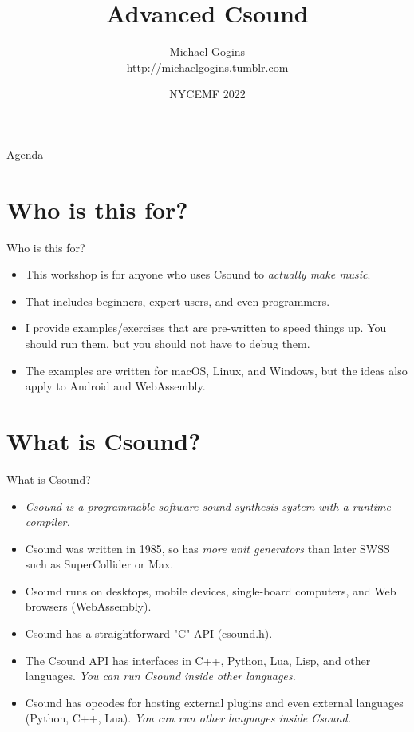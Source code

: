 \documentclass{beamer}
\title{Advanced Csound}
\author[Gogins]
{Michael Gogins \\ \url{http://michaelgogins.tumblr.com}}
\institute[Irreducible Productions]{Irreducible Productions \\ New York}
\date[NYCEMF 2022]{NYCEMF 2022}
\begin{document}

\maketitle

\begin{frame}{Agenda}
\tableofcontents
\end{frame}

\section{Who is this for?}
\begin{frame}{Who is this for?}
\begin{itemize}
\item This workshop is for anyone who uses Csound to \emph{actually make music}.
\item That includes beginners, expert users, and even programmers.
\item I provide examples/exercises that are pre-written to speed things up. You should run them, but you should not have to debug them.
\item The examples are written for macOS, Linux, and Windows, but the ideas also apply to Android and WebAssembly.
\end{itemize}
\end{frame}

\section{What is Csound?}
\begin{frame}{What is Csound?}
\begin{itemize}
\item \emph{Csound is a programmable software sound synthesis system with a runtime compiler.}
\item Csound was written in 1985, so has \emph{more unit generators} than later SWSS such as SuperCollider or Max.
\item Csound runs on desktops, mobile devices, single-board computers, and Web browsers (WebAssembly).
\item Csound has a straightforward "C" API (csound.h).
\item The Csound API has interfaces in C++, Python, Lua, Lisp, and other languages. \emph{You can run Csound inside other languages.}
\item Csound has opcodes for hosting external plugins and even external languages (Python, C++, Lua). \emph{You can run other languages inside Csound.}
\end{itemize}
\end{frame}
\end{document}
